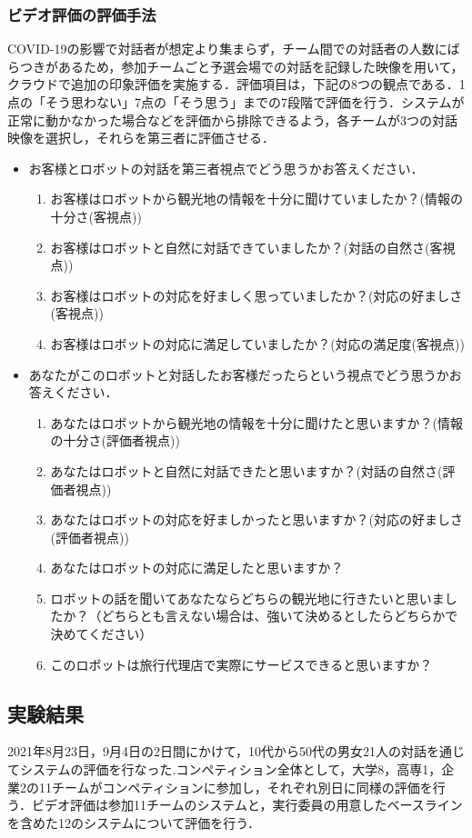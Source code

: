 \subsubsection{ビデオ評価の評価手法}
COVID-19の影響で対話者が想定より集まらず，チーム間での対話者の人数にばらつきがあるため，参加チームごと予選会場での対話を記録した映像を用いて，クラウドで追加の印象評価を実施する．評価項目は，下記の8つの観点である．1点の「そう思わない」7点の「そう思う」までの7段階で評価を行う．システムが正常に動かなかった場合などを評価から排除できるよう，各チームが3つの対話映像を選択し，それらを第三者に評価させる．
\begin{itemize}
    \item お客様とロボットの対話を第三者視点でどう思うかお答えください．
    \begin{enumerate}
        \item お客様はロボットから観光地の情報を十分に聞けていましたか？(情報の十分さ(客視点))
        \item お客様はロボットと自然に対話できていましたか？(対話の自然さ(客視点))
        \item お客様はロボットの対応を好ましく思っていましたか？(対応の好ましさ(客視点))
        \item お客様はロボットの対応に満足していましたか？(対応の満足度(客視点))
    \end{enumerate}
    \item あなたがこのロボットと対話したお客様だったらという視点でどう思うかお答えください．
    \begin{enumerate}
        \item あなたはロボットから観光地の情報を十分に聞けたと思いますか？(情報の十分さ(評価者視点))
        \item あなたはロボットと自然に対話できたと思いますか？(対話の自然さ(評価者視点))
        \item あなたはロボットの対応を好ましかったと思いますか？(対応の好ましさ(評価者視点))
        \item あなたはロボットの対応に満足したと思いますか？
        \item ロボットの話を聞いてあなたならどちらの観光地に行きたいと思いましたか？（どちらとも言えない場合は、強いて決めるとしたらどちらかで決めてください）
        \item このロボットは旅行代理店で実際にサービスできると思いますか？
    \end{enumerate}
\end{itemize}

\subsection{実験結果}
2021年8月23日，9月4日の2日間にかけて，10代から50代の男女21人の対話を通じてシステムの評価を行なった.コンペティション全体として，大学8，高専1，企業2の11チームがコンペティションに参加し，それぞれ別日に同様の評価を行う．ビデオ評価は参加11チームのシステムと，実行委員の用意したベースラインを含めた12のシステムについて評価を行う．

